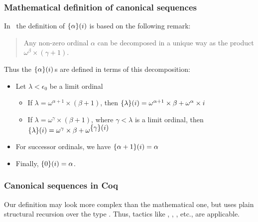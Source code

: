\subsubsection{Mathematical definition of canonical sequences} 

In~\cite{KS81} the definition of $\mbox{$\{\alpha\}(i)$}$ is based on the following remark:
\begin{quote}
Any non-zero ordinal $\alpha$ can be decomposed in a unique way as the product
$\omega^\beta\times (\gamma+1)$.
\end{quote}

Thus the $\mbox{$\{\alpha\}(i)$}$\,s are defined in terms of this decomposition:
\begin{definition}
\label{def:canonseq-math}
  
\end{definition}
\begin{mathframe}
  \begin{itemize}
\item Let $\lambda<\epsilon_0$ be a limit ordinal 

\begin{itemize}
\item If $\lambda=\omega^{\alpha+1}\times (\beta+1)$, then 
$\mbox{$\{\lambda\}(i)$}= \omega^{\alpha+1}\times\beta +  \omega^\alpha \times i$
\item If $\lambda=\omega^{\gamma}\times (\beta+1)$, where $\gamma<\lambda$ is a limit ordinal, then 
$\mbox{$\{\lambda\}(i)$}=\omega^{\gamma}\times \beta + \omega^{\mbox{$\{\gamma\}(i)$}}$
\end{itemize}

\item For successor ordinals, we have $\mbox{$\{\alpha+1\}(i)$}= \alpha$ 

\item Finally, $\mbox{$\{0\}(i)$}= \alpha$.
\end{itemize}
\end{mathframe}

\subsubsection{Canonical sequences in Coq}

Our definition may look more complex than the mathematical one, but
uses plain structural recursion over the type . Thus, tactics like
, , , etc., are applicable. 

